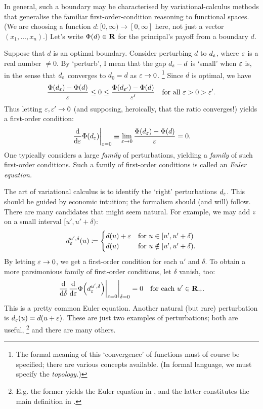 In general, such a boundary may be characterised by variational-calculus methods that generalise the familiar first-order-condition reasoning to functional spaces.
(We are choosing a function $d : [0,\infty) \to [0,\infty]$ here, not just a vector $(x_1,\dots,x_n)$.)
Let's write $\Phi(d) \in \mathbf{R}$ for the principal's payoff from a boundary $d$.

Suppose that $d$ is an optimal boundary.
Consider perturbing $d$ to $d_\varepsilon$, where $\varepsilon$ is a real number $\neq 0$.
By `perturb', I mean that the gap $d_\varepsilon-d$ is `small' when $\varepsilon$ is, 
in the sense that $d_\varepsilon$ converges to $d_0 = d$ as $\varepsilon \to 0$.%
	\footnote{The formal meaning of this `convergence' of functions must of course be specified; there are various concepts available. (In formal language, we must specify the \emph{topology.})}
Since $d$ is optimal, we have
%
\begin{equation*}
	\frac{ \Phi(d_\varepsilon) - \Phi(d) }{ \varepsilon }
	\leq 0
	\leq \frac{ \Phi(d_{\varepsilon'}) - \Phi(d) }{ \varepsilon' }
	\quad \text{for all $\varepsilon>0>\varepsilon'$.}
\end{equation*}
%
Thus letting $\varepsilon,\varepsilon' \to 0$
(and supposing, heroically, that the ratio converges!)
yields a first-order condition:
%
\begin{equation*}
	\left. \frac{\dd}{\dd \eps} \Phi(d_\eps) \right|_{\eps=0}
	\equiv \lim_{\eps \to 0} \frac{ \Phi(d_\eps) - \Phi(d) }{ \eps }
	= 0 .
\end{equation*}
%
One typically considers a large \emph{family} of perturbations, yielding a \emph{family} of such first-order conditions.
Such a family of first-order conditions is called an \emph{Euler equation.}

The art of variational calculus is to identify the `right' perturbations $d_\varepsilon$.
This should be guided by economic intuition; the formalism should (and will) follow.
There are many candidates that might seem natural.
For example, we may add $\varepsilon$ on a small interval $[u',u'+\delta)$:
%
\begin{equation*}
	d^{u',\delta}_\varepsilon(u)
	\coloneqq
	\begin{cases}
		d(u) + \varepsilon 
		&\text{for $u \in [u',u'+\delta)$} \\
		d(u)
		&\text{for $u \notin [u',u'+\delta)$.} 
	\end{cases}
\end{equation*}
%
By letting $\varepsilon \to 0$, we get a first-order condition for each $u'$ and $\delta$. To obtain a more parsimonious family of first-order conditions, let $\delta$ vanish, too:
%
\begin{equation*}
	\left. \frac{\dd}{\dd \delta} \left. \frac{\dd}{\dd \eps}
	\Phi\left( d^{u',\delta}_\eps \right)
	\right|_{\eps=0} \right|_{\delta=0}
	= 0
	\quad \text{for each $u' \in \R_+$.}
\end{equation*}
%
This is a pretty common Euler equation.
Another natural (but rare) perturbation is $d_\varepsilon(u) = d(u+\varepsilon)$.
These are just two examples of perturbations;
both are useful,%
	\footnote{E.g. the former yields the Euler equation in \textcite{sfb}, and the latter constitutes the main definition in \textcite{Sinander2022}.}
and there are many others.

